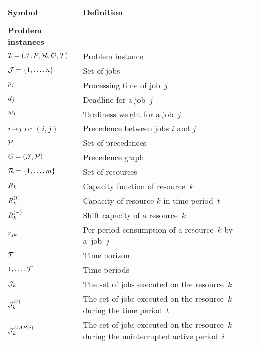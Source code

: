  \label{sec:notation}

\begin{table}[!ht]
    \centering
    \begin{tabularx}{\textwidth}{p{}p{}}
        \textbf{Symbol} & \textbf{Definition} \\
        \hline
        \\

        \textbf{Problem instances}      & \cellrule \\
        $\mathcal{I} = (\mathcal{J}, \mathcal{P}, \mathcal{R}, \mathcal{O}, \mathcal{T})$ & Problem instance \\
        $\mathcal{J} = \{ 1, \dots, n \}$     & Set of jobs \\
        $p_{j}$                  & Processing time of job~$j$ \\
        $d_{j}$                  & Deadline for a job~$j$ \\
        $w_{j}$           & Tardiness weight for a job~$j$ \\
        $i \hspace{-0.2em} \rightarrow \hspace{-0.2em} j$ or $(i,j)$  & Precedence between jobs $i$ and $j$ \\
        $\mathcal{P}$                  & Set of precedences \\
        $G = (\mathcal{J}, \mathcal{P})$     & Precedence graph \\
        $\mathcal{R} = \{1, \dots, m\}$  & Set of resources \\
        $R_{k}$                 & Capacity function of resource~$k$ \\
        $\capacity{k}{t}$               & Capacity of resource $k$ in time period~$t$ \\
        $\shiftcapacity{k}$             & Shift capacity of a resource~$k$ \\
        $r_{j k}$            & Per-period consumption of a resource~$k$ by a~job~$j$ \\
        $\mathcal{T}$                      & Time horizon \\
        $1, \dots, \mathcal{T}$            & Time periods \\
        $\mathcal{J}_{k}$
            & The set of jobs executed on the resource~$k$ \\
        $\mathcal{J}_{k}^{(t)}$
            & The set of jobs executed on the resource~$k$ during the time period~$t$ \\
        $\mathcal{J}_{k}^{UAP(i)}$
            & The set of jobs executed on the resource~$k$ during the uninterrupted active period~$i$\\
        \\


\end{tabularx}
\end{table}
